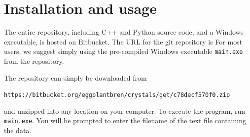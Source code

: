 \documentclass[a4paper, 12pt]{article}
\begin{document}
\section{Installation and usage}

The entire repository, including C++ and Python source code, and a Windows
executable, is hosted on Bitbucket. The URL for the git repository is
For most users, we suggest simply using the pre-compiled Windows executable
{\tt main.exe} from the repository.

The repository can simply be downloaded from

{\tt https://bitbucket.org/eggplantbren/crystals/get/c78decf570f0.zip}

and unzipped into any location on your computer. To execute the program,
run {\tt main.exe}. You will be prompted to enter the filename of the text
file containing the data.




\end{document}
